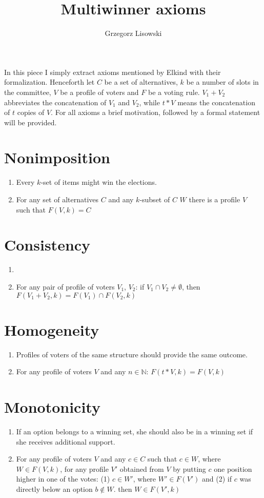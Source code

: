 \documentclass{article}
\title{Multiwinner axioms}
\author{Grzegorz Lisowski}
\begin{document}
\maketitle
In this piece I simply extract axioms mentioned by Elkind with their formalization. Henceforth let $C$ be a set of alternatives, $k$ be a number of slots in the committee, $V$ be a profile of voters and $F$ be a voting rule. $V_1 + V_2$ abbreviates the concatenation of $V_1$ and $V_2$, while $t*V$ means the concatenation of $t$ copies of $V$. For all axioms a brief motivation, followed by a formal statement will be provided.
\section{Nonimposition}
\begin{enumerate}
\item Every $k$-set of items might win the elections.
\item For any set of alternatives $C$ and any $k$-subset of $C$ $W$ there is a profile $V$ such that $F(V, k)=C$
\end{enumerate}

\section{Consistency}
\begin{enumerate}
\item 
\item For any pair of profile of voters $V_1$, $V_2$: if $V_1 \cap V_2 \neq \emptyset$, then $F(V_1+V_2, k)=F(V_1) \cap F(V_2, k)$
\end{enumerate}

\section{Homogeneity}
\begin{enumerate}
\item Profiles of voters of the same structure should provide the same outcome.
\item For any profile of voters $V$ and any $n \in \mathbb{N}$: $F(t*V, k)=F(V, k)$
\end{enumerate}

\section{Monotonicity}
\begin{enumerate}
\item If an option belongs to a winning set, she should also be in a winning set if she receives additional support.
\item For any profile of voters $V$ and any $c \in C$ such that $c \in W$, where $W \in F(V, k)$, for any profile $V'$ obtained from $V$ by putting $c$ one position higher in one of the votes: (1) $c \in W'$, where $W' \in F(V')$ and (2) if $c$ was directly below an option $b \notin W$. then $W \in F(V', k)$
\end{enumerate}
\end{document}
